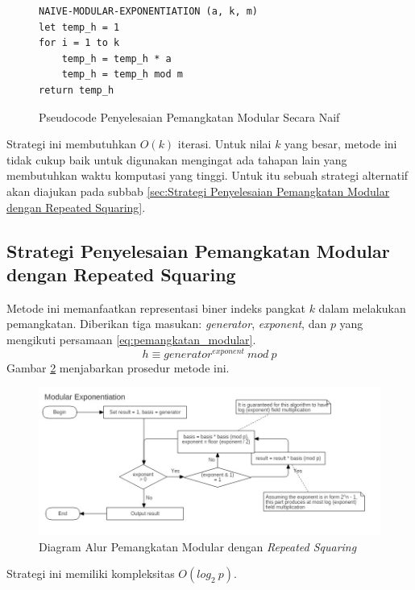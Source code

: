 \begin{figure}
\begin{lstlisting}[firstnumber=0]
NAIVE-MODULAR-EXPONENTIATION (a, k, m)
let temp_h = 1
for i = 1 to k
	temp_h = temp_h * a
	temp_h = temp_h mod m
return temp_h
\end{lstlisting}
\caption{Pseudocode Penyelesaian Pemangkatan Modular Secara Naif}
\label{psdo:modex_naive}
\end{figure}

Strategi ini membutuhkan $O(k)$ iterasi. Untuk nilai $k$ yang besar, metode ini tidak cukup baik untuk digunakan mengingat ada tahapan lain yang membutuhkan waktu komputasi yang tinggi. Untuk itu sebuah strategi alternatif akan diajukan pada subbab \ref{sec:Strategi Penyelesaian Pemangkatan Modular dengan Repeated Squaring}.

\subsection{Strategi Penyelesaian Pemangkatan Modular dengan Repeated Squaring}

Metode ini memanfaatkan representasi biner indeks pangkat $k$ dalam melakukan pemangkatan. Diberikan tiga masukan: \textit{generator}, \textit{exponent}, dan $p$ yang mengikuti persamaan \eqref{eq:pemangkatan_modular}.
\begin{equation}
	h \equiv generator^{exponent}\ mod\ p
	\label{eq:pemangkatan_modular_repeated_squaring}
\end{equation}
Gambar \ref{fig:repeated_squaring} menjabarkan prosedur metode ini.
\begin{figure}
	\Centering
	\includegraphics[scale=0.5,angle=90]{bab2/img/modular-exponentiation}
	\caption{Diagram Alur Pemangkatan Modular dengan \textit{Repeated Squaring}}
	\label{fig:repeated_squaring}
\end{figure}

Strategi ini memiliki kompleksitas $O\left(log_2\ p\right)$.

